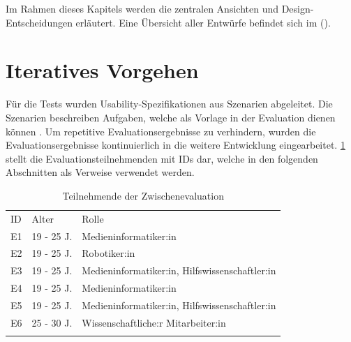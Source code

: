 Im Rahmen dieses Kapitels werden die zentralen Ansichten und
Design-Entscheidungen erläutert. Eine Übersicht aller Entwürfe befindet sich im
(\label{appendix:digitaleMedien}).

\section{Iteratives Vorgehen}
Für die Tests wurden Usability-Spezifikationen aus Szenarien abgeleitet. Die
Szenarien beschreiben Aufgaben, welche als Vorlage in der Evaluation dienen
können . Um repetitive
Evaluationsergebnisse zu verhindern, wurden die Evaluationsergebnisse
kontinuierlich in die weitere Entwicklung eingearbeitet. \ref{table:e} stellt
die Evaluationsteilnehmenden mit IDs dar, welche in den folgenden Abschnitten
als Verweise verwendet werden.

\begin{table}[h]
    \centering
    \caption{Teilnehmende der Zwischenevaluation}
    \begin{tabular}{lll}
        \arrayrulecolor{maincolor}\hline
        \sffamily\color{maincolor}ID & \sffamily\color{maincolor}Alter &
        \sffamily\color{maincolor}Rolle
        \\
        \arrayrulecolor{maincolor}\hline
        E1                           & 19 - 25 J.                      &
        Medieninformatiker:in
        \\
        E2                           & 19 - 25 J.                      &
        Robotiker:in                                                     \\
        E3                           & 19 - 25 J.                      &
        Medieninformatiker:in, Hilfswissenschaftler:in                   \\
        E4                           & 19 - 25 J.                      &
        Medieninformatiker:in                                            \\
        E5                           & 19 - 25 J.                      &
        Medieninformatiker:in, Hilfswissenschaftler:in
        \\
        E6                           & 25 - 30 J.                      &
        Wissenschaftliche:r Mitarbeiter:in                               \\
        \arrayrulecolor{maincolor}\hline
    \end{tabular}
    \label{table:e}
\end{table}

